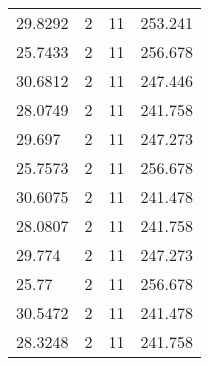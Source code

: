 \documentclass[bwprint]{gmcmthesis}
\begin{document}
\begin{longtable}{llll}
29.8292   & 2           & 11          & 253.241   \\
25.7433   & 2           & 11          & 256.678   \\
30.6812   & 2           & 11          & 247.446   \\
28.0749   & 2           & 11          & 241.758   \\
29.697    & 2           & 11          & 247.273   \\
25.7573   & 2           & 11          & 256.678   \\
30.6075   & 2           & 11          & 241.478   \\
28.0807   & 2           & 11          & 241.758   \\
29.774    & 2           & 11          & 247.273   \\
25.77     & 2           & 11          & 256.678   \\
30.5472   & 2           & 11          & 241.478   \\
28.3248   & 2           & 11          & 241.758   \\
\end{longtable}
\end{document}
